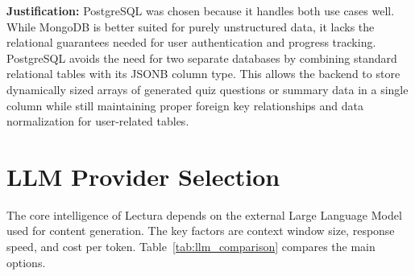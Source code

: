 \begin{table}[htbp]
\centering
{}
\vspace{6pt}
\caption{Database comparison based on schema flexibility and query performance.}
\label{tab:database_comparison}
\end{table}

\textbf{Justification:} PostgreSQL was chosen because it handles both use cases well. While MongoDB is better suited for purely unstructured data, it lacks the relational guarantees needed for user authentication and progress tracking. PostgreSQL avoids the need for two separate databases by combining standard relational tables with its JSONB column type. This allows the backend to store dynamically sized arrays of generated quiz questions or summary data in a single column while still maintaining proper foreign key relationships and data normalization for user-related tables.

\section{LLM Provider Selection}
The core intelligence of Lectura depends on the external Large Language Model used for content generation. The key factors are context window size, response speed, and cost per token. Table~\ref{tab:llm_comparison} compares the main options.

\begin{table}[htbp]
\centering
{}
\vspace{6pt}
\caption{Comparison of LLM providers by context window, speed, and cost.}
\label{tab:llm_comparison}
\end{table}

